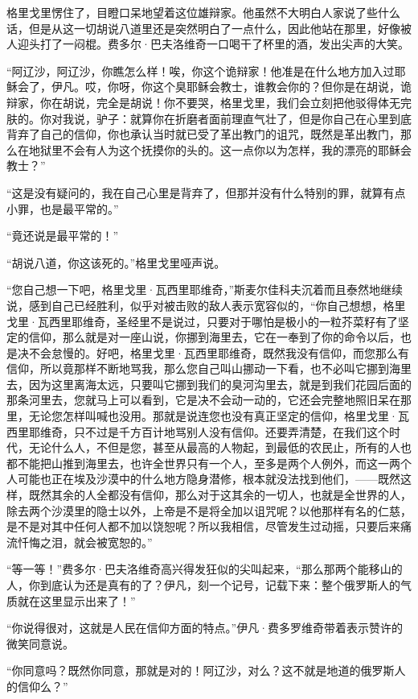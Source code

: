 \par 格里戈里愣住了，目瞪口呆地望着这位雄辩家。他虽然不大明白人家说了些什么话，但是从这一切胡说八道里还是突然明白了一点什么，因此他站在那里，好像被人迎头打了一闷棍。费多尔·巴夫洛维奇一口喝干了杯里的酒，发出尖声的大笑。
\par “阿辽沙，阿辽沙，你瞧怎么样！唉，你这个诡辩家！他准是在什么地方加入过耶稣会了，伊凡。哎，你呀，你这个臭耶稣会教士，谁教会你的？但你是在胡说，诡辩家，你在胡说，完全是胡说！你不要哭，格里戈里，我们会立刻把他驳得体无完肤的。你对我说，驴子：就算你在折磨者面前理直气壮了，但是你自己在心里到底背弃了自己的信仰，你也承认当时就已受了革出教门的诅咒，既然是革出教门，那么在地狱里不会有人为这个抚摸你的头的。这一点你以为怎样，我的漂亮的耶稣会教士？”
\par “这是没有疑问的，我在自己心里是背弃了，但那并没有什么特别的罪，就算有点小罪，也是最平常的。”
\par “竟还说是最平常的！”
\par “胡说八道，你这该死的。”格里戈里哑声说。
\par “您自己想一下吧，格里戈里·瓦西里耶维奇，”斯麦尔佳科夫沉着而且泰然地继续说，感到自己已经胜利，似乎对被击败的敌人表示宽容似的，“你自己想想，格里戈里·瓦西里耶维奇，圣经里不是说过，只要对于哪怕是极小的一粒芥菜籽有了坚定的信仰，那么就是对一座山说，你挪到海里去，它在一奉到了你的命令以后，也是决不会怠慢的。好吧，格里戈里·瓦西里耶维奇，既然我没有信仰，而您那么有信仰，所以竟那样不断地骂我，那么您自己叫山挪动一下看，也不必叫它挪到海里去，因为这里离海太远，只要叫它挪到我们的臭河沟里去，就是到我们花园后面的那条河里去，您就马上可以看到，它是决不会动一动的，它还会完整地照旧呆在那里，无论您怎样叫喊也没用。那就是说连您也没有真正坚定的信仰，格里戈里·瓦西里耶维奇，只不过是千方百计地骂别人没有信仰。还要弄清楚，在我们这个时代，无论什么人，不但是您，甚至从最高的人物起，到最低的农民止，所有的人也都不能把山推到海里去，也许全世界只有一个人，至多是两个人例外，而这一两个人可能也正在埃及沙漠中的什么地方隐身潜修，根本就没法找到他们，——既然这样，既然其余的人全都没有信仰，那么对于这其余的一切人，也就是全世界的人，除去两个沙漠里的隐士以外，上帝是不是将全加以诅咒呢？以他那样有名的仁慈，是不是对其中任何人都不加以饶恕呢？所以我相信，尽管发生过动摇，只要后来痛流忏悔之泪，就会被宽恕的。”
\par “等一等！”费多尔·巴夫洛维奇高兴得发狂似的尖叫起来，“那么那两个能移山的人，你到底认为还是真有的了？伊凡，刻一个记号，记载下来：整个俄罗斯人的气质就在这里显示出来了！”
\par “你说得很对，这就是人民在信仰方面的特点。”伊凡·费多罗维奇带着表示赞许的微笑同意说。
\par “你同意吗？既然你同意，那就是对的！阿辽沙，对么？这不就是地道的俄罗斯人的信仰么？”

